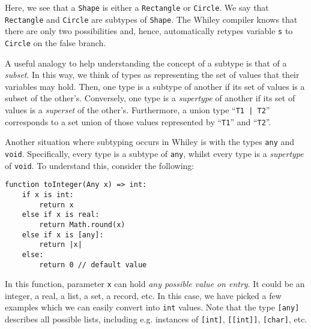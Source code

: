 Here, we see that a \lstinline{Shape} is either a \lstinline{Rectangle} or \lstinline{Circle}.  We say that \lstinline{Rectangle} and \lstinline{Circle} are subtypes of \lstinline{Shape}.  The Whiley compiler knows that there are only two possibilities and, hence, automatically retypes variable \lstinline{s} to \lstinline{Circle} on the false branch.

\begin{insight}
A useful analogy to help understanding the concept of a subtype is that of a {\em subset}.  In this way, we think of types as representing the set of values that their variables may hold.  Then, one type is a subtype of another if its set of values is a subset of the other's.  Conversely, one type is a {\em supertype} of another if its set of values is a {\em superset} of the other's.  Furthermore, a union type ``\lstinline{T1 | T2}'' corresponds to a set union of those values represented by ``\lstinline{T1}'' and ``\lstinline{T2}''.
\end{insight}

Another situation where subtyping occurs in Whiley is with the types \lstinline{any} and \lstinline{void}.  Specifically, every type is a subtype of \lstinline{any}, whilst every type is a {\em supertype} of \lstinline{void}.  To understand this, consider the following:

\begin{lstlisting}
function toInteger(Any x) => int:
    if x is int:
        return x
    else if x is real:
        return Math.round(x)
    else if x is [any]:
        return |x|
    else:
        return 0 // default value
\end{lstlisting}

In this function, parameter \lstinline{x} can hold {\em any possible value on entry}.  It could be an integer, a real, a list, a set, a record, etc.  In this case, we have picked a few examples which we can easily convert into \lstinline{int} values.  Note that the type \lstinline{[any]} describes all possible lists, including e.g. instances of \lstinline{[int]}, \lstinline{[[int]]}, \lstinline{[char]}, etc.

